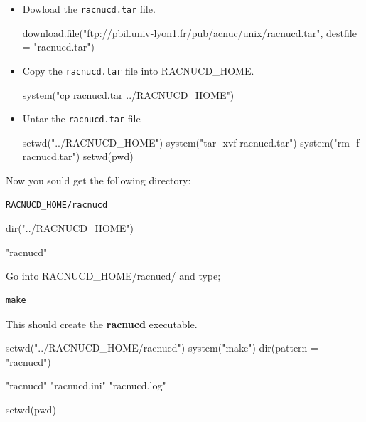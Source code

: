 \documentclass{article}
\begin{document}
\begin{itemize}
\item Dowload the \texttt{racnucd.tar} file.

\begin{Schunk}
\begin{Sinput}
 download.file("ftp://pbil.univ-lyon1.fr/pub/acnuc/unix/racnucd.tar", 
     destfile = "racnucd.tar")
\end{Sinput}
\end{Schunk}

\item Copy the \texttt{racnucd.tar} file into RACNUCD\_HOME.

\begin{Schunk}
\begin{Sinput}
 system("cp racnucd.tar ../RACNUCD_HOME")
\end{Sinput}
\end{Schunk}

\item Untar the \texttt{racnucd.tar} file 

\begin{Schunk}
\begin{Sinput}
 setwd("../RACNUCD_HOME")
 system("tar -xvf racnucd.tar")
 system("rm -f racnucd.tar")
 setwd(pwd)
\end{Sinput}
\end{Schunk}

\end{itemize}
Now you sould get the following directory:
\begin{verbatim}
RACNUCD_HOME/racnucd
\end{verbatim}

\begin{Schunk}
\begin{Sinput}
 dir("../RACNUCD_HOME")
\end{Sinput}
\begin{Soutput}
[1] "racnucd"
\end{Soutput}
\end{Schunk}

Go into RACNUCD\_HOME/racnucd/ and type;
\begin{verbatim}
make
\end{verbatim}
This should create the \textbf{racnucd} executable.

\begin{Schunk}
\begin{Sinput}
 setwd("../RACNUCD_HOME/racnucd")
 system("make")
 dir(pattern = "racnucd")
\end{Sinput}
\begin{Soutput}
[1] "racnucd"     "racnucd.ini" "racnucd.log"
\end{Soutput}
\begin{Sinput}
 setwd(pwd)
\end{Sinput}
\end{Schunk}
\end{document}
